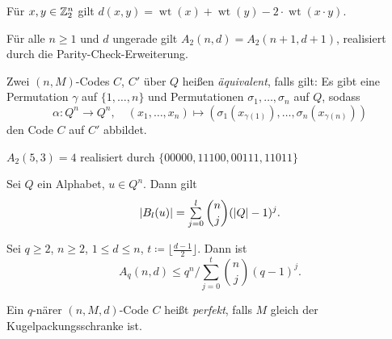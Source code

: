 \documentclass{cheat-sheet}
\newcommand{\floor}[1]{\lfloor #1 \rfloor} %
\DeclareMathOperator{\wt}{wt} %
\begin{document}

\begin{lem}
  Für $x, y \in \mathbb{Z}_2^n$ gilt $d(x,y) = \wt(x) + \wt(y) - 2 \cdot \wt(x \cdot y)$.
\end{lem}

\begin{satz}
  Für alle $n \geq 1$ und $d$ ungerade gilt $A_2(n, d) = A_2(n+1,d+1)$, realisiert durch die Parity-Check-Erweiterung.
\end{satz}

\begin{defn}
  Zwei $(n,M)$-Codes $C$, $C'$ über $Q$ heißen \emph{äquivalent}, falls gilt:
  Es gibt eine Permutation $\gamma$ auf $\{ 1, \ldots, n \}$ und Permutationen $\sigma_1, \ldots, \sigma_n$ auf $Q$, sodass
  \[
    \alpha : Q^n \to Q^n, \quad
    (x_1, \ldots, x_n) \mapsto (\sigma_1(x_{\gamma(1)}), \ldots, \sigma_n(x_{\gamma(n)}))
  \]
  den Code $C$ auf $C'$ abbildet.
\end{defn}




\begin{bsp}
  $A_2(5, 3) = 4$ realisiert durch $\{ 00000, 11100, 00111, 11011 \}$
\end{bsp}



\begin{lem}
  Sei $Q$ ein Alphabet, $u \in Q^n$. %
  Dann gilt
  \[ \abs{B_l(u)} = \sum_{j=0}^l {n \choose j} (\abs{Q}-1)^j. \]
\end{lem}

\begin{satz}
  Sei $q \geq 2$, $n \geq 2$, $1 \leq d \leq n$, $t \coloneqq \floor{\tfrac{d-1}{2}}$. Dann ist
  \[ A_q(n, d) \leq q^n / \sum_{j=0}^t {n \choose j} (q-1)^j. \]
\end{satz}

\begin{defn}
  Ein $q$-närer $(n, M, d)$-Code $C$ heißt \emph{perfekt}, falls $M$ gleich der Kugelpackungsschranke ist.
\end{defn}

\iffalse
\begin{bsp}
  $n = 6$, $q = 2$, $d = 3$. \\
  Singleton-Schranke: $A_2(6, 3) \leq 2^{6-3+1} = 2^4 = 16$ \\
  Kugelpackungsschranke: $A_2(6, 3) \leq \floor{\frac{\floor{2^6}}{{6 \choose 0} (2-1)^0 + {6 \choose 1} (2-1)^1}} = 9$
\end{bsp}
\fi
\end{document}
